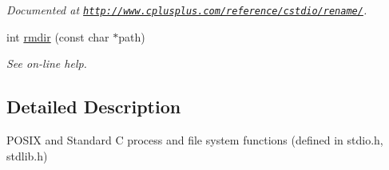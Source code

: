 \begin{DoxyCompactItemize}
\begin{DoxyCompactList}\small\item\em Documented at \href{http://www.cplusplus.com/reference/cstdio/rename/}{\tt http\-://www.\-cplusplus.\-com/reference/cstdio/rename/}. \end{DoxyCompactList}\item 
\hypertarget{group__process_gab2df76f2c62ae012c2e417813b5fe8ce}{int \hyperlink{group__process_gab2df76f2c62ae012c2e417813b5fe8ce}{rmdir} (const char $\ast$path)}\label{group__process_gab2df76f2c62ae012c2e417813b5fe8ce}

\begin{DoxyCompactList}\small\item\em See on-\/line help. \end{DoxyCompactList}\end{DoxyCompactItemize}


\subsection{Detailed Description}
P\-O\-S\-I\-X and Standard C process and file system functions (defined in stdio.\-h, stdlib.\-h) 